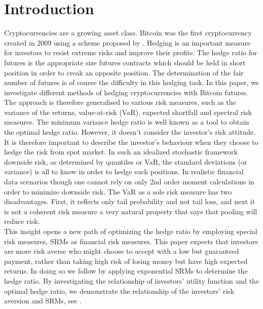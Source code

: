 \documentclass[11pt,a4paper,english]{article}
\begin{document}
\section{Introduction}

Cryptocurrencies are a growing asset class.
Bitcoin was the first cryptocurrency created in 2009 using a scheme proposed by \citet{nakamoto2019bitcoin}.
Hedging is an important measure for investors to resist extreme risks and improve their profits.
The hedge ratio for futures is the appropriate size futures contracts which should be held in short position
in order to creak an opposite position.
The determination of the fair number of futures is of course the difficulty in this hedging task.
In this paper, we investigate different methods of hedging cryptocurrencies with Bitcoin futures.
The approach is therefore generalised to various risk measures, such as the variance of the returns,
value-at-risk (VaR), expected shortfall and spectral risk measures.
The minimum variance hedge ratio is well known as a tool to obtain the optimal hedge ratio.
However, it doesn't consider the investor's risk attitude.
It is therefore important to describe the investor's behaviour when they choose to hedge the risk from spot market.
In such an idealized stochastic framework downside risk, as determined by quantiles or VaR,
the standard deviations (or variance) is all to know in order to hedge such positions.
In realistic financial data scenarios though one cannot rely on only 2nd order moment calculations in order to minimize downside risk.
The VaR as a sole risk measure has two disadvantages.
First, it reflects only tail probability and not tail loss, and next it is not a coherent risk measure a very natural property that says that pooling will reduce risk. \\

This insight opens a new path of optimizing the hedge ratio by employing special risk measures, SRMs as financial risk measures.
This paper expects that investors are more risk averse who might choose to accept with a low but guaranteed payment,
rather than taking high risk of losing money but have high expected returns.
In doing so we follow \citet{barbi2014copula} by applying exponential SRMs to determine the hedge ratio.
By investigating the relationship of investors' utility function and the optimal hedge ratio, we demonstrate the relationship of the investors' risk aversion and SRMs, see \citet{brandtner2015decision}.\\
\end{document}
